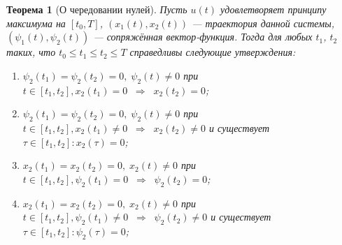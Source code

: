 \documentclass[11pt]{article}
\newtheorem{theorem}{Теорема}
\begin{document}
\begin{theorem}[О чередовании нулей]
Пусть $u(t)$ удовлетворяет принципу максимума на $[t_0, T]$, $(x_1(t), x_2(t))$ --- траектория данной системы, $(\psi_1(t), \psi_2(t))$ --- сопряжённая вектор-функция. Тогда для любых $t_1$, $t_2$ таких, что $t_0 \leqslant t_1 \leqslant t_2 \leqslant T$ справедливы следующие утверждения:
\begin{enumerate}
\item
$\psi_2(t_1) = \psi_2(t_2) = 0, \; \psi_2(t) \neq 0$ при $t \in [t_1, t_2], x_2(t_1) = 0 \; \; \Rightarrow \; \; x_2(t_2) = 0$;
\item
$\psi_2(t_1) = \psi_2(t_2) = 0, \; \psi_2(t) \neq 0$ при $t \in [t_1, t_2], x_2(t_1) \neq 0 \; \; \Rightarrow \; \; x_2(t_2) \neq 0$ и существует $\tau \in [t_1, t_2]: x_2(\tau) = 0$;
\item
$x_2(t_1) = x_2(t_2) = 0, \; x_2(t) \neq 0$ при $t \in [t_1, t_2], \psi_2(t_1) = 0 \; \; \Rightarrow \; \; \psi_2(t_2) = 0$;
\item
$x_2(t_1) = x_2(t_2) = 0, \; x_2(t) \neq 0$ при $t \in [t_1, t_2], \psi_2(t_1) \neq 0 \; \; \Rightarrow \; \; \psi_2(t_2) \neq 0$ и существует $\tau \in [t_1, t_2]: \psi_2(\tau) = 0$;
\end{enumerate}
\end{theorem}
\end{document}
